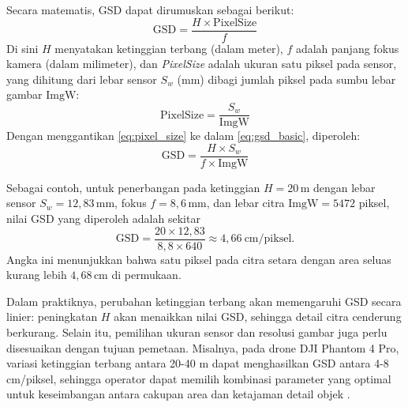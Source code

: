 Secara matematis, GSD dapat dirumuskan sebagai berikut:
\begin{equation}
  \label{eq:gsd_basic}
  \mathrm{GSD}
  = \frac{H \times \mathrm{PixelSize}}{f}
\end{equation}
Di sini $H$ menyatakan ketinggian terbang (dalam meter), $f$ adalah panjang fokus kamera (dalam milimeter), dan \emph{PixelSize} adalah ukuran satu piksel pada sensor, yang dihitung dari lebar sensor $S_w$ (mm) dibagi jumlah piksel pada sumbu lebar gambar $\mathrm{ImgW}$:
\begin{equation}
  \label{eq:pixel_size}
  \mathrm{PixelSize}
  = \frac{S_w}{\mathrm{ImgW}}
\end{equation}
Dengan menggantikan \eqref{eq:pixel_size} ke dalam \eqref{eq:gsd_basic}, diperoleh:
\begin{equation}
  \label{eq:gsd_full}
  \mathrm{GSD}
  = \frac{H \times S_w}{f \times \mathrm{ImgW}}
\end{equation}

Sebagai contoh, untuk penerbangan pada ketinggian $H = 20\,$m dengan lebar sensor $S_w = 12{,}83\,$mm, fokus $f = 8{,}6\,$mm, dan lebar citra $\mathrm{ImgW} = 5472$ piksel, nilai GSD yang diperoleh adalah sekitar
\[
  \mathrm{GSD}
  = \frac{20 \times 12{,}83}{8{,}8 \times 640}
  \approx 4{,}66\ \mathrm{cm/piksel}.
\]
Angka ini menunjukkan bahwa satu piksel pada citra setara dengan area seluas kurang lebih $4{,}68\,$cm di permukaan.

Dalam praktiknya, perubahan ketinggian terbang akan memengaruhi GSD secara linier: peningkatan $H$ akan menaikkan nilai GSD, sehingga detail citra cenderung berkurang. Selain itu, pemilihan ukuran sensor dan resolusi gambar juga perlu disesuaikan dengan tujuan pemetaan. Misalnya, pada drone DJI Phantom 4 Pro, variasi ketinggian terbang antara 20-40 m dapat menghasilkan GSD antara 4-8 cm/piksel, sehingga operator dapat memilih kombinasi parameter yang optimal untuk keseimbangan antara cakupan area dan ketajaman detail objek \cite{Tilon2023}.


